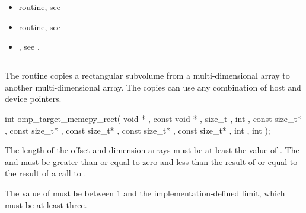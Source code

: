 \begin{ccppspecific}
\begin{itemize}
\item {} routine, see 

\item {} routine, see 


\item {}, see 
.
\end{itemize}


\vspace{-1\baselineskip}
\subsection{}
\label{subsec:omp_target_memcpy_rect}
\summary

The  routine copies a rectangular subvolume from
a multi-dimensional array to another multi-dimensional array. The copies can
use any combination of host and device pointers.

\format
\begin{samepage}
\begin{boxedcode}
int omp\_target\_memcpy\_rect(
               void * , const void * ,
               size\_t ,
               int ,
               const size\_t* ,
               const size\_t* ,
               const size\_t* ,
               const size\_t* ,
               const size\_t* ,
               int , int );
\end{boxedcode}
\end{samepage}

\constraints
The length of the offset and dimension arrays must be at least the
value of .
The  and 
must be greater than or equal to zero and less than the result of
 or equal to the result of a call to
.

The value of  must be between 1 and the implementation-defined
limit, which must be at least three.


\effect


\end{ccppspecific}
